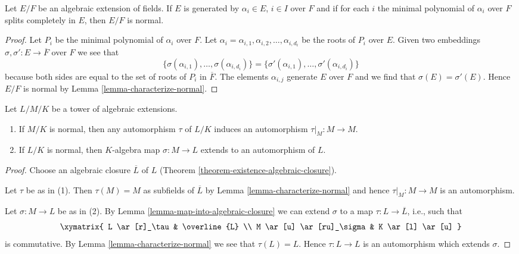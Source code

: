 \begin{lemma}
\label{lemma-normally-generated}
Let $E/F$ be an algebraic extension of fields.
If $E$ is generated by $\alpha_i \in E$, $i \in I$
over $F$ and if for each $i$ the minimal polynomial
of $\alpha_i$ over $F$ splits completely in $E$, then
$E/F$ is normal.
\end{lemma}

\begin{proof}
Let $P_i$ be the minimal polynomial of $\alpha_i$ over $F$.
Let $\alpha_i = \alpha_{i, 1}, \alpha_{i, 2}, \ldots, \alpha_{i, d_i}$
be the roots of $P_i$ over $E$. Given two embeddings
$\sigma, \sigma' : E \to \overline{F}$ over $F$ we see that
$$
\{\sigma(\alpha_{i, 1}), \ldots, \sigma(\alpha_{i, d_i})\} =
\{\sigma'(\alpha_{i, 1}), \ldots, \sigma'(\alpha_{i, d_i})\}
$$
because both sides are equal to the set of roots of $P_i$
in $\overline{F}$. The elements $\alpha_{i, j}$
generate $E$ over $F$ and we find that $\sigma(E) = \sigma'(E)$.
Hence $E/F$ is normal by Lemma \ref{lemma-characterize-normal}.
\end{proof}

\begin{lemma}
\label{lemma-lift-maps}
Let $L/M/K$ be a tower of algebraic extensions.
\begin{enumerate}
\item If $M/K$ is normal, then any automorphism $\tau$ of $L/K$
induces an automorphism $\tau|_M : M \to M$.
\item If $L/K$ is normal, then $K$-algebra map $\sigma : M \to L$
extends to an automorphism of $L$.
\end{enumerate}
\end{lemma}

\begin{proof}
Choose an algebraic closure $\overline{L}$ of $L$
(Theorem \ref{theorem-existence-algebraic-closure}).

\medskip\noindent
Let $\tau$ be as in (1). Then $\tau(M) = M$ as subfields of $\overline{L}$
by Lemma \ref{lemma-characterize-normal} and hence
$\tau|_M : M \to M$ is an automorphism.

\medskip\noindent
Let $\sigma : M \to L$ be as in (2).
By Lemma \ref{lemma-map-into-algebraic-closure}
we can extend $\sigma$ to a map
$\tau : L \to \overline{L}$, i.e., such that
$$
\xymatrix{
L \ar[r]_\tau & \overline{L} \\
M \ar[u] \ar[ru]_\sigma & K \ar[l] \ar[u]
}
$$
is commutative. By Lemma \ref{lemma-characterize-normal} we see that
$\tau(L) = L$. Hence $\tau : L \to L$ is an automorphism which
extends $\sigma$.
\end{proof}

